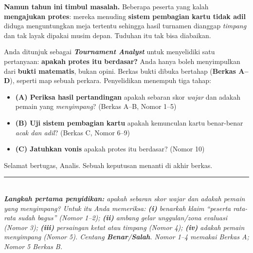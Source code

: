 \documentclass[11pt]{article}
\begin{document}
\smallskip
\textbf{Namun tahun ini timbul masalah.} Beberapa peserta yang kalah
\textbf{mengajukan protes}: mereka menuding \textbf{sistem pembagian kartu tidak
adil} diduga menguntungkan meja tertentu sehingga hasil turnamen dianggap
\emph{timpang} dan tak layak dipakai musim depan. Tuduhan itu tak bisa diabaikan.

\smallskip
Anda ditunjuk sebagai \textbf{\textit{Tournament Analyst}} untuk menyelidiki satu
pertanyaan: \textbf{apakah protes itu berdasar?} Anda hanya boleh menyimpulkan dari
\textbf{bukti matematis}, bukan opini. Berkas bukti dibuka bertahap
(\textbf{Berkas A--D}), seperti map sebuah perkara. Penyelidikan menempuh tiga
tahap:
\begin{itemize}[leftmargin=1.6em,itemsep=1pt,topsep=2pt]
  \item \textbf{(A) Periksa hasil pertandingan} apakah sebaran skor
        \emph{wajar} dan adakah pemain yang \emph{menyimpang}? (Berkas A--B, Nomor 1--5)
  \item \textbf{(B) Uji sistem pembagian kartu} apakah kemunculan kartu benar-benar
        \emph{acak dan adil}? (Berkas C, Nomor 6--9)
  \item \textbf{(C) Jatuhkan vonis} apakah protes itu berdasar? (Nomor 10)
\end{itemize}
Selamat bertugas, Analis. Sebuah keputusan menanti di akhir berkas.

\vspace{0.3cm}
\noindent\rule{\linewidth}{0.6pt}
\vspace{0.1cm}

\\[0.2em]
\small\emph{\textbf{Langkah pertama penyidikan:} apakah sebaran skor \emph{wajar}
dan adakah pemain yang \emph{menyimpang}? Untuk itu Anda memeriksa: \textbf{(i)}
benarkah klaim ``peserta rata-rata sudah bagus'' (Nomor 1--2); \textbf{(ii)} ambang
\emph{gelar unggulan}/\emph{zona evaluasi} (Nomor 3); \textbf{(iii)} persaingan
ketat atau timpang (Nomor 4); \textbf{(iv)} adakah pemain menyimpang (Nomor 5).
Centang \textbf{Benar}/\textbf{Salah}. Nomor 1--4 memakai Berkas A; Nomor 5 Berkas B.}\normalsize

\bigskip
\end{document}
